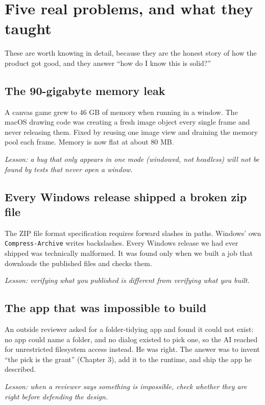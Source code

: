 \documentclass[11pt,a4paper]{report}
\begin{document}
\section{Five real problems, and what they taught}

These are worth knowing in detail, because they are the honest story of
how the product got good, and they answer ``how do I know this is solid?''

\subsection{The 90-gigabyte memory leak}

A canvas game grew to 46 GB of memory when running in a window. The macOS
drawing code was creating a fresh image object every single frame and
never releasing them. Fixed by reusing one image view and draining the
memory pool each frame. Memory is now flat at about 80 MB.

\emph{Lesson: a bug that only appears in one mode (windowed, not headless)
will not be found by tests that never open a window.}

\subsection{Every Windows release shipped a broken zip file}

The ZIP file format specification requires forward slashes in paths.
Windows' own \texttt{Compress-\allowbreak Archive} writes backslashes.
Every Windows release we had ever shipped was technically malformed. It
was found only when we built a job that downloads the published files and
checks them.

\emph{Lesson: verifying what you published is different from verifying what
you built.}

\subsection{The app that was impossible to build}

An outside reviewer asked for a folder-tidying app and found it could not
exist: no app could name a folder, and no dialog existed to pick one, so
the AI reached for unrestricted filesystem access instead. He was right.
The answer was to invent ``the pick is the grant'' (Chapter 3), add it to
the runtime, and ship the app he described.

\emph{Lesson: when a reviewer says something is impossible, check whether
they are right before defending the design.}
\end{document}
